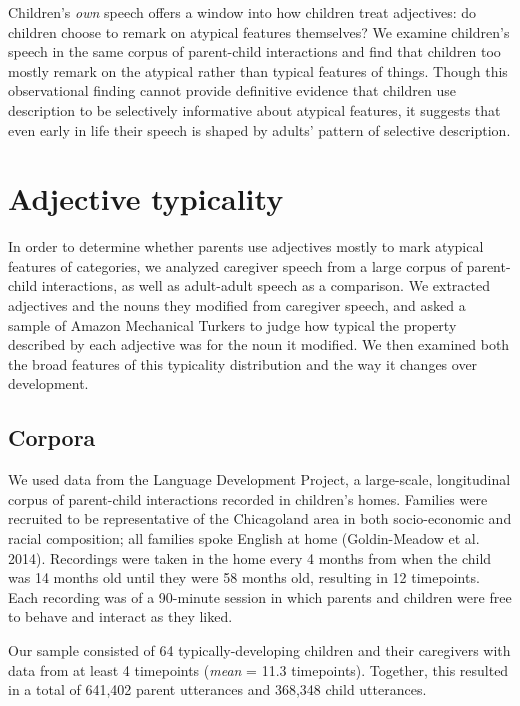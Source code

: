 \documentclass{ucetd}
\begin{document}
Children's \emph{own} speech offers a window into how children treat
adjectives: do children choose to remark on atypical features
themselves? We examine children's speech in the same corpus of
parent-child interactions and find that children too mostly remark on
the atypical rather than typical features of things. Though this
observational finding cannot provide definitive evidence that children
use description to be selectively informative about atypical features,
it suggests that even early in life their speech is shaped by adults'
pattern of selective description.

\hypertarget{adjective-typicality}{%
\section{Adjective typicality}\label{adjective-typicality}}

In order to determine whether parents use adjectives mostly to mark
atypical features of categories, we analyzed caregiver speech from a
large corpus of parent-child interactions, as well as adult-adult speech
as a comparison. We extracted adjectives and the nouns they modified
from caregiver speech, and asked a sample of Amazon Mechanical Turkers
to judge how typical the property described by each adjective was for
the noun it modified. We then examined both the broad features of this
typicality distribution and the way it changes over development.

\hypertarget{corpora}{%
\subsection{Corpora}\label{corpora}}

We used data from the Language Development Project, a large-scale,
longitudinal corpus of parent-child interactions recorded in children's
homes. Families were recruited to be representative of the Chicagoland
area in both socio-economic and racial composition; all families spoke
English at home (Goldin-Meadow et al. 2014). Recordings were taken in
the home every 4 months from when the child was 14 months old until they
were 58 months old, resulting in 12 timepoints. Each recording was of a
90-minute session in which parents and children were free to behave and
interact as they liked.

Our sample consisted of 64 typically-developing children and their
caregivers with data from at least 4 timepoints (\emph{mean} = 11.3
timepoints). Together, this resulted in a total of 641,402 parent
utterances and 368,348 child utterances.
\end{document}
